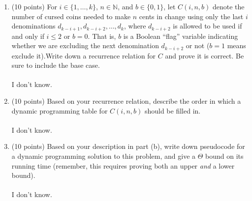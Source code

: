 \documentclass[12pt]{article}
\begin{document}
\begin{enumerate}
\begin{enumerate}
\item \label{3a} (10 points) For $i \in \{1,\dotsc,k\}$, $n \in \mathbb{N}$, and $b \in \{0,1\}$, let
    $C(i,n,b)$ denote the number of cursed coins needed to make $n$ cents in
    change using only the last $i$ denominations $d_{k-i+1}, d_{k-i+2}, \dotsc, d_k$,
    where $d_{k-i+2}$ is allowed to be used if and only if $i \leq 2$ or
    $b=0$. That is, $b$ is a Boolean ``flag'' variable indicating whether
    we are excluding the next denomination $d_{k-i+2}$ or not ($b=1$ means exclude
    it).Write down a recurrence relation for $C$ and prove it is
    correct. Be sure to include the base case. \\
\\
I don't know.
\pagebreak
	
\item \label{3b} (10 points) Based on your recurrence relation, describe the order in
    which a dynamic programming table for $C(i,n,b)$ should be filled in.\\
\\ I don't know.
\pagebreak
	
\item \label{3c} (10 points) Based on your description in part (b), write down pseudocode for a
    dynamic programming solution to this problem, and give a $\Theta$ bound on
    its running time (remember, this requires proving both an upper
    \emph{and} a lower bound).\\
\\ I don't know.
\pagebreak
\end{enumerate}
	
	

\end{enumerate}
\end{document}
